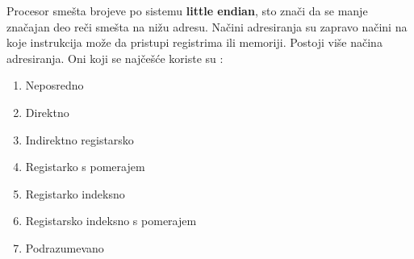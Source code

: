 \documentclass[a4paper]{article}
\begin{document}
Procesor sme\v sta brojeve po sistemu \textbf{little endian}, sto zna\v ci da se manje zna\v cajan deo re\v ci sme\v sta na ni\v zu 
adresu. Na\v cini adresiranja su zapravo na\v cini na koje instrukcija mo\v ze da pristupi registrima ili memoriji. 
Postoji vi\v se na\v cina adresiranja. Oni koji se naj\v ce\v s\' ce koriste su \cite{Arhitektura}:
\begin{enumerate}
\item {Neposredno}
\item {Direktno}
\item {Indirektno registarsko}
\item {Registarko s pomerajem}
\item {Registarko indeksno}
\item {Registarsko indeksno s pomerajem}
\item {Podrazumevano}
\end{enumerate}
\end{document}

